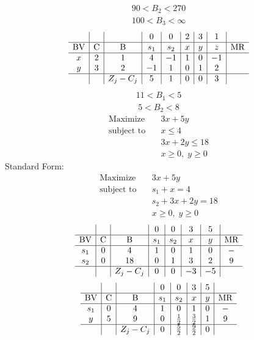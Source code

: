 \documentclass{article}
\begin{document}
\begin{align*}
90<B_{2}<270\end{align*}
\begin{align*}
100<B_{3}<\infty\end{align*}
\begin{align*}
\begin{array}{c|c|c|c|c|c|c|c|c}
 &  &  & 0 & 0 & 2 & 3 & 1 & \\
\hline
\text{BV} & \text{C} & \text{B} & s_{1} & s_{2} & x & y & z & \text{MR} \\
\hline
x & 2 & 1 & 4 & -1 & 1 & 0 & -1 \\
y & 3 & 2 & -1 & 1 & 0 & 1 & 2 \\
\hline
 &  & Z_j-C_j & 5 & 1 & 0 & 0 & 3 & \\
\end{array}
\end{align*}
\begin{align*}
11<B_{1}<5\end{align*}
\begin{align*}
5<B_{2}<8\end{align*}
\begin{align*}
\text{Maximize} \quad & 3x + 5y\\
\text{subject to} \quad
& x\le4\\
& 3x + 2y\le18\\
& x\ge0,\; y\ge0\end{align*}
Standard Form:\\
\begin{align*}
\text{Maximize} \quad & 3x + 5y\\
\text{subject to} \quad
& s_{1} + x=4\\
& s_{2} + 3x + 2y=18\\
& x\ge0,\; y\ge0\end{align*}
\begin{align*}
\begin{array}{c|c|c|c|c|c|c|c}
 &  &  & 0 & 0 & 3 & 5 & \\
\hline
\text{BV} & \text{C} & \text{B} & s_{1} & s_{2} & x & y & \text{MR} \\
\hline
s_{1} & 0 & 4 & 1 & 0 & 1 & 0 & - \\
s_{2} & 0 & 18 & 0 & 1 & 3 & 2 & 9 \\
\hline
 &  & Z_j-C_j & 0 & 0 & -3 & -5 & \\
\end{array}
\end{align*}
\begin{align*}
\begin{array}{c|c|c|c|c|c|c|c}
 &  &  & 0 & 0 & 3 & 5 & \\
\hline
\text{BV} & \text{C} & \text{B} & s_{1} & s_{2} & x & y & \text{MR} \\
\hline
s_{1} & 0 & 4 & 1 & 0 & 1 & 0 & - \\
y & 5 & 9 & 0 & \frac{1}{2} & \frac{3}{2} & 1 & 9 \\
\hline
 &  & Z_j-C_j & 0 & \frac{5}{2} & \frac{9}{2} & 0 & \\
\end{array}
\end{align*}
\end{document}

